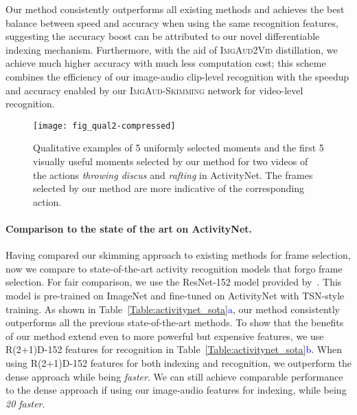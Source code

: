 Our method consistently outperforms all existing methods and achieves the best balance between speed and accuracy when using the same recognition features, suggesting the accuracy boost can be attributed to our novel differentiable indexing mechanism. Furthermore, with the aid of \textsc{ImgAud2Vid} distillation, we achieve much higher accuracy with much less computation cost; this scheme combines the efficiency of our image-audio clip-level recognition with the speedup and accuracy enabled by our \textsc{ImgAud-Skimming} network for video-level recognition.

\begin{figure}
    \center
    \texttt{[image: fig\_qual2-compressed]}
    \caption{Qualitative examples of 5 uniformly selected moments and the first 5 visually useful moments selected by our method for two videos of the actions \emph{throwing discus} and \emph{rafting} in ActivityNet. The frames selected by our method are more indicative of the corresponding action. \vspace{-0.2in}
    }
    \label{fig:qualitative_examples}
    \vspace{-0.1in}
\end{figure}

\paragraph{Comparison to the state of the art
on ActivityNet.} 
Having compared our skimming approach to existing methods for frame selection, now we compare to state-of-the-art activity recognition models that forgo frame selection. For fair comparison, we use the ResNet-152 model provided by~\cite{wu2019multiagent}. This model is pre-trained on ImageNet and fine-tuned on ActivityNet with TSN-style~\cite{wang2016temporal} training. As shown in Table~\ref{Table:activitynet_sota}\textcolor{blue}{a}, our method consistently outperforms all the previous state-of-the-art methods. To show that the benefits of our method extend even to more powerful but expensive features, we use R(2+1)D-152 features for recognition in Table~\ref{Table:activitynet_sota}\textcolor{blue}{b}. When using R(2+1)D-152 features for both indexing and recognition, we outperform the dense approach while being \emph{ faster}. We can still achieve comparable performance to the dense approach if using our image-audio features for indexing, while being \emph{20 faster}.

